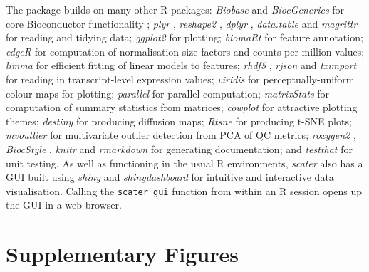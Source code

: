 \documentclass{revtex4}
\begin{document}
The package builds on many other R packages: \emph{Biobase} and \emph{BiocGenerics} for core Bioconductor functionality  \citep{Huber2015-en}; \emph{plyr} \citep{Wickham2015-kj}, \emph{reshape2} \citep{Wickham2012-ec}, \emph{dplyr} \citep{Wickham2015-la}, \emph{data.table} \citep{Dowle2015-zc} and \emph{magrittr} \citep{Bache2014-sa} for reading and
tidying data; \emph{ggplot2} \citep{Wickham2016-dc} for plotting; \emph{biomaRt} \citep{Durinck2005-yz} for feature annotation; \emph{edgeR} \citep{Robinson2010-ky} for computation of normalisation size factors and counts-per-million values; \emph{limma} \citep{Ritchie2015-so} for efficient fitting of linear models to features; \emph{rhdf5} \citep{Fischer2016-me}, \emph{rjson} \citep{Couture-Beil2014-kk} and \emph{tximport} \citep{Soneson2015-fw} for reading in transcript-level expression values;
\emph{viridis} \citep{Garnier2016-hk} for perceptually-uniform colour
maps for plotting; \emph{parallel} for parallel computation; \emph{matrixStats} \citep{Bengtsson2016-tn} for computation of summary statistics from matrices; \emph{cowplot} \citep{Wilke2016-hj} for attractive plotting themes; \emph{destiny} \citep{Angerer2015-sw} for producing diffusion maps; \emph{Rtsne} \citep{Krijthe2015-is} for producing t-SNE plots; \emph{mvoutlier}
\citep{Filzmoser2015-kx} for multivariate outlier detection from PCA of QC metrics; \emph{roxygen2} \citep{Wickham2015-pu}, \emph{BiocStyle} \citep{Huber2015-en}, \emph{knitr} \citep{Xie2013-bn} and \emph{rmarkdown} \citep{Allaire2016-dl} for generating documentation; and \emph{testthat} \citep{Wickham2011-cj} for unit testing. As well as functioning in the usual R environments, \emph{scater} also has a GUI built using
\emph{shiny} \citep{Chang2016-of} and \emph{shinydashboard} \citep{Chang2015-bn} for intuitive and interactive data visualisation. Calling the \verb|scater_gui| function from within an R session opens up the GUI in a web browser.


\section*{Supplementary Figures}
\end{document}
